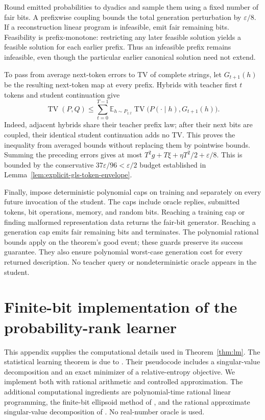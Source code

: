 \documentclass[11pt]{article}
\newcommand{\TV}{\operatorname{TV}}
\theoremstyle{definition}
\theoremstyle{remark}
\begin{document}
Round emitted probabilities to dyadics and sample them using a fixed number of fair bits. A prefixwise coupling bounds the total generation perturbation by $\varepsilon/8$. If a reconstruction linear program is infeasible, emit fair remaining bits. Feasibility is prefix-monotone: restricting any later feasible solution yields a feasible solution for each earlier prefix. Thus an infeasible prefix remains infeasible, even though the particular earlier canonical solution need not extend.

To pass from average next-token errors to TV of complete strings, let $G_{t+1}(h)$ be the resulting next-token map at every prefix. Hybrids with teacher first $t$ tokens and student continuation give
\[
\TV(P,Q)\le\sum_{t=0}^{T-1}
\mathbb E_{h\sim P_{1:t}}
 \TV\bigl(P(\cdot\mid h),G_{t+1}(h)\bigr).
\]
Indeed, adjacent hybrids share their teacher prefix law; after their next bits are coupled, their identical student continuation adds no TV. This proves the inequality from averaged bounds without replacing them by pointwise bounds. Summing the preceding errors gives at most $T^2g+T\xi+\eta T^2/2+\varepsilon/8$. This is bounded by the conservative $37\varepsilon/96<\varepsilon/2$ budget established in Lemma~\ref{lem:explicit-gls-token-envelope}.

Finally, impose deterministic polynomial caps on training and separately on every future invocation of the student. The caps include oracle replies, submitted tokens, bit operations, memory, and random bits. Reaching a training cap or finding malformed representation data returns the fair-bit generator. Reaching a generation cap emits fair remaining bits and terminates. The polynomial rational bounds apply on the theorem's good event; these guards preserve its success guarantee. They also ensure polynomial worst-case generation cost for every returned description. No teacher query or nondeterministic oracle appears in the student.


\section{Finite-bit implementation of the probability-rank learner}\label{sec:finite-bit-lm}

This appendix supplies the computational details used in Theorem~\ref{thm:lm}. The statistical learning theorem is due to \citet{liu-moitra}. Their pseudocode includes a singular-value decomposition and an exact minimizer of a relative-entropy objective. We implement both with rational arithmetic and controlled approximation. The additional computational ingredients are polynomial-time rational linear programming, the finite-bit ellipsoid method of \citet{ellipsoid}, and the rational approximate singular-value decomposition of \citet[Definition~6.13 and Theorem~6.16]{rational-svd}. No real-number oracle is used.
\end{document}
